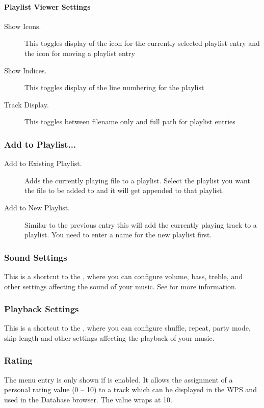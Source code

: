 \paragraph{Playlist Viewer Settings}
  \begin{description}
    \item[Show Icons.] This toggles display of the icon for the currently
    selected playlist entry and the icon for moving a playlist entry
    \item[Show Indices.] This toggles display of the line numbering for
       the playlist
    \item[Track Display.] This toggles between filename only and full path
       for playlist entries
  \end{description}


\subsubsection{Add to Playlist...}
  \begin{description}
    \item [Add to Existing Playlist.] Adds the currently playing file to a playlist.
    Select the playlist you want the file to be added to and it will get
    appended to that playlist.
    \item [Add to New Playlist.] Similar to the previous entry this will
    add the currently playing track to a playlist. You need to enter a name
    for the new playlist first.
  \end{description}

\subsubsection{Sound Settings}
This is a shortcut to the , where you can configure volume,
bass, treble, and other settings affecting the sound of your music.
See  for more information.

\subsubsection{Playback Settings}
This is a shortcut to the , where you can configure shuffle,
repeat, party mode, skip length and other settings affecting the playback of your music.

\subsubsection{Rating}
The menu entry is only shown if  is
enabled. It allows the assignment of a personal rating value (0 -- 10)
to a track which can be displayed in the WPS and used in the Database
browser. The value wraps at 10.

